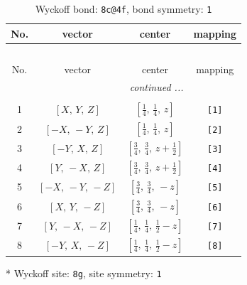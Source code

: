 \documentclass[fleqn,8pt]{jsarticle}
\begin{document}
\renewcommand{\arraystretch}{1.2}
\begin{longtable}{cccc}
\caption{Wyckoff bond: {\tt 8c@4f}, bond symmetry: {\tt 1}}
 \\
 \hline \hline
No. & vector & center & mapping \\ \hline \endfirsthead

\multicolumn{3}{l}{\tablename\ \thetable{}} \\
 \hline \hline
No. & vector & center & mapping \\ \hline \endhead

 \hline \hline
\multicolumn{3}{r}{\footnotesize\it continued ...} \\ \endfoot

 \hline \hline
\multicolumn{3}{r}{} \\ \endlastfoot

1 & $\left[ X,\, Y,\, Z \right]$ & $\left[ \frac{1}{4},\, \frac{1}{4},\, z \right]$ & {\tt [1]} \\ \hline
2 & $\left[ - X,\, - Y,\, Z \right]$ & $\left[ \frac{1}{4},\, \frac{1}{4},\, z \right]$ & {\tt [2]} \\ \hline
3 & $\left[ - Y,\, X,\, Z \right]$ & $\left[ \frac{3}{4},\, \frac{3}{4},\, z + \frac{1}{2} \right]$ & {\tt [3]} \\ \hline
4 & $\left[ Y,\, - X,\, Z \right]$ & $\left[ \frac{3}{4},\, \frac{3}{4},\, z + \frac{1}{2} \right]$ & {\tt [4]} \\ \hline
5 & $\left[ - X,\, - Y,\, - Z \right]$ & $\left[ \frac{3}{4},\, \frac{3}{4},\, - z \right]$ & {\tt [5]} \\ \hline
6 & $\left[ X,\, Y,\, - Z \right]$ & $\left[ \frac{3}{4},\, \frac{3}{4},\, - z \right]$ & {\tt [6]} \\ \hline
7 & $\left[ Y,\, - X,\, - Z \right]$ & $\left[ \frac{1}{4},\, \frac{1}{4},\, \frac{1}{2} - z \right]$ & {\tt [7]} \\ \hline
8 & $\left[ - Y,\, X,\, - Z \right]$ & $\left[ \frac{1}{4},\, \frac{1}{4},\, \frac{1}{2} - z \right]$ & {\tt [8]} \\
\end{longtable}
* Wyckoff site: {\tt 8g}, site symmetry: {\tt 1}
\renewcommand{\arraystretch}{1.2}
\end{document}
